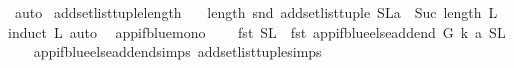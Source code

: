 \begin{isabellebody}
\ auto%
\endisatagproof
{\isafoldproof}%
%
\isadelimproof
\isanewline
%
\endisadelimproof
\isanewline
{}\isamarkupfalse%
\ add{\isacharunderscore}{\kern0pt}set{\isacharunderscore}{\kern0pt}list{\isacharunderscore}{\kern0pt}tuple{\isacharunderscore}{\kern0pt}length{\isacharcolon}{\kern0pt}\isanewline
\ \ \ {\isachardoublequoteopen}length\ {\isacharparenleft}{\kern0pt}snd\ {\isacharparenleft}{\kern0pt}add{\isacharunderscore}{\kern0pt}set{\isacharunderscore}{\kern0pt}list{\isacharunderscore}{\kern0pt}tuple\ {\isacharparenleft}{\kern0pt}{\isacharparenleft}{\kern0pt}S{\isacharcomma}{\kern0pt}L{\isacharparenright}{\kern0pt}{\isacharcomma}{\kern0pt}a{\isacharparenright}{\kern0pt}{\isacharparenright}{\kern0pt}{\isacharparenright}{\kern0pt}\ {\isacharequal}{\kern0pt}\ Suc\ {\isacharparenleft}{\kern0pt}length\ L{\isacharparenright}{\kern0pt}{\isachardoublequoteclose}\isanewline
%
\isadelimproof
%
\endisadelimproof
%
\isatagproof
{}\isamarkupfalse%
{\isacharparenleft}{\kern0pt}induct\ L{\isacharcomma}{\kern0pt}\ auto{\isacharparenright}{\kern0pt}\ \isamarkupfalse%
%
\endisatagproof
{\isafoldproof}%
%
\isadelimproof
%
\endisadelimproof
%
\isadelimdocument
%
\endisadelimdocument
%
\isatagdocument
%
\isamarkuptrue%
%
\endisatagdocument
{\isafolddocument}%
%
\isadelimdocument
%
\endisadelimdocument
{}\isamarkupfalse%
\ app{\isacharunderscore}{\kern0pt}if{\isacharunderscore}{\kern0pt}blue{\isacharunderscore}{\kern0pt}mono{\isacharcolon}{\kern0pt}\isanewline
\ \ \ \ {\isachardoublequoteopen}{\isacharparenleft}{\kern0pt}fst\ {\isacharparenleft}{\kern0pt}S{\isacharcomma}{\kern0pt}L{\isacharparenright}{\kern0pt}{\isacharparenright}{\kern0pt}\ {\isasymsubseteq}\ {\isacharparenleft}{\kern0pt}fst\ {\isacharparenleft}{\kern0pt}app{\isacharunderscore}{\kern0pt}if{\isacharunderscore}{\kern0pt}blue{\isacharunderscore}{\kern0pt}else{\isacharunderscore}{\kern0pt}add{\isacharunderscore}{\kern0pt}end\ G\ k\ a\ {\isacharparenleft}{\kern0pt}S{\isacharcomma}{\kern0pt}L{\isacharparenright}{\kern0pt}{\isacharparenright}{\kern0pt}{\isacharparenright}{\kern0pt}{\isachardoublequoteclose}\isanewline
%
\isadelimproof
\ \ %
\endisadelimproof
%
\isatagproof
{}\isamarkupfalse%
\ app{\isacharunderscore}{\kern0pt}if{\isacharunderscore}{\kern0pt}blue{\isacharunderscore}{\kern0pt}else{\isacharunderscore}{\kern0pt}add{\isacharunderscore}{\kern0pt}end{\isachardot}{\kern0pt}simps\ add{\isacharunderscore}{\kern0pt}set{\isacharunderscore}{\kern0pt}list{\isacharunderscore}{\kern0pt}tuple{\isachardot}{\kern0pt}simps\isanewline

\end{isabellebody}
